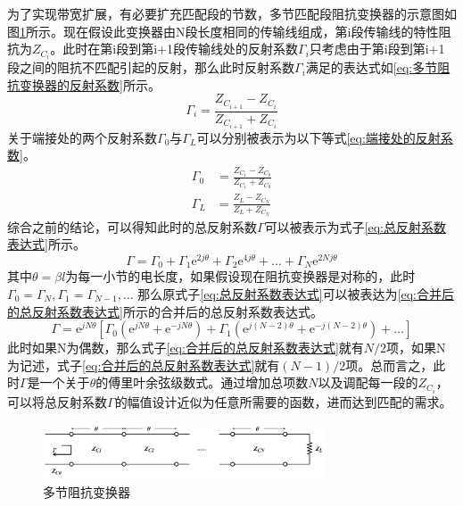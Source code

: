 \documentclass[master]{thesis-uestc}
\begin{document}
为了实现带宽扩展，有必要扩充匹配段的节数，多节匹配段阻抗变换器的示意图如图\ref{fig:多节阻抗变换器}所示。现在假设此变换器由N段长度相同的传输线组成，第i段传输线的特性阻抗为\(Z_{C_i}\)。此时在第i段到第i+1段传输线处的反射系数\(\Gamma_i\)只考虑由于第i段到第i+1段之间的阻抗不匹配引起的反射，那么此时反射系数\(\Gamma_i\)满足的表达式如\ref{eq:多节阻抗变换器的反射系数}所示。
\begin{equation}\label{eq:多节阻抗变换器的反射系数}
    \Gamma_i = \frac{Z_{C_{i+1}}-Z_{C_{i}}}{Z_{C_{i+1}}+Z_{C_{i}}}
\end{equation}
关于端接处的两个反射系数\(\Gamma_0\)与\(\Gamma_L\)可以分别被表示为以下等式\ref{eq:端接处的反射系数}。
\begin{subequations}\label{eq:端接处的反射系数}
    \begin{align}
        \Gamma_0 &= \frac{Z_{C_1}-Z_{C_0}}{Z_{C_1}+Z_{C_0}} \\
        \Gamma_L &= \frac{Z_L-Z_{C_N}}{Z_L+Z_{C_N}}
    \end{align}
\end{subequations}
综合之前的结论，可以得知此时的总反射系数\(\Gamma\)可以被表示为式子\ref{eq:总反射系数表达式}所示。
\begin{equation}\label{eq:总反射系数表达式}
    \Gamma = \Gamma_0+\Gamma_1 \mathrm{e}^{2 j \theta}+\Gamma_2 \mathrm{e}^{4 j \theta}+...+\Gamma_N \mathrm{e}^{2 N j \theta}
\end{equation}
其中\(\theta = \beta l\)为每一小节的电长度，如果假设现在阻抗变换器是对称的，此时\(\Gamma_0 = \Gamma_N, \Gamma_1 = \Gamma_{N-1}, \dots \)
那么原式子\ref{eq:总反射系数表达式}可以被表达为\ref{eq:合并后的总反射系数表达式}所示的合并后的总反射系数表达式。
\begin{equation}\label{eq:合并后的总反射系数表达式}
    \Gamma = \mathrm{e}^{j  N \theta} \left[\Gamma_0\left(\mathrm{e}^{j N \theta}+\mathrm{e}^{- j N \theta} \right) + \Gamma_1\left(\mathrm{e}^{j (N-2) \theta}+\mathrm{e}^{- j (N-2) \theta} \right) + \dots \right]
\end{equation}
此时如果N为偶数，那么式子\ref{eq:合并后的总反射系数表达式}就有\(N/2\)项，如果N为记述，式子\ref{eq:合并后的总反射系数表达式}就有\((N-1)/2\)项。总而言之，此时\(\Gamma\)是一个关于\(\theta\)的傅里叶余弦级数式。通过增加总项数\(N\)以及调配每一段的\(Z_{C_i}\)，可以将总反射系数\(\Gamma\)的幅值设计近似为任意所需要的函数，进而达到匹配的需求。
\begin{figure}[!htb]
    \centering
    \includegraphics[width=0.75\textwidth]{pic/chapter2/多节阻抗匹配示意图.png}
    \caption{多节阻抗变换器}
    \label{fig:多节阻抗变换器}
\end{figure}
\end{document}
